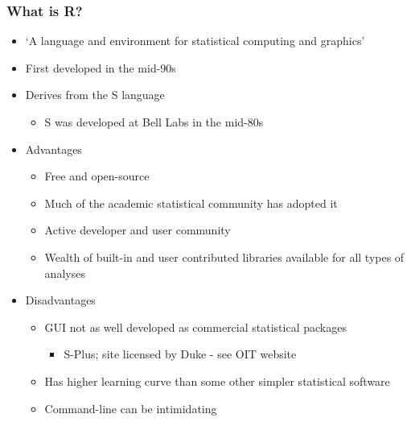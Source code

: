 \documentclass{beamer}
\begin{document}
\begin{frame}
  \frametitle{What is R?}
\begin{itemize}

\item `A language and environment for statistical computing and graphics'
\item First developed in the mid-90s
\item Derives from the S language
\begin{itemize}
	\item S was developed at Bell Labs in the mid-80s
\end{itemize}

\item Advantages

	\begin{itemize}
	\item Free and open-source
	\item Much of the academic statistical community has adopted it
	\item Active developer and user community
	\item Wealth of built-in and user contributed libraries available for all types of analyses
	\end{itemize}

\item Disadvantages
	\begin{itemize}
		\item GUI not as well developed as commercial statistical packages
			\begin{itemize}
				\item S-Plus; site licensed by Duke - see OIT website
			\end{itemize}
		\item Has higher learning curve than some other simpler statistical software
		\item Command-line can be intimidating
	\end{itemize}

\end{itemize}

\end{frame}
\end{document}
